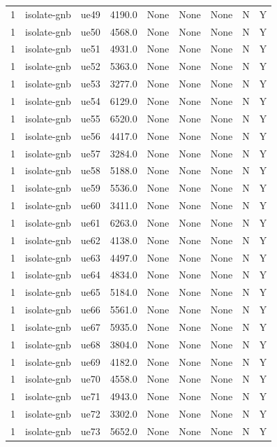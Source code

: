 \begin{table}[ht]
\begin{tabular}{|c|c|c|c|c|c|c|c|c|}
1 & isolate-gnb & ue49 & 4190.0 & None & None & None & N & Y \\
1 & isolate-gnb & ue50 & 4568.0 & None & None & None & N & Y \\
1 & isolate-gnb & ue51 & 4931.0 & None & None & None & N & Y \\
1 & isolate-gnb & ue52 & 5363.0 & None & None & None & N & Y \\
1 & isolate-gnb & ue53 & 3277.0 & None & None & None & N & Y \\
1 & isolate-gnb & ue54 & 6129.0 & None & None & None & N & Y \\
1 & isolate-gnb & ue55 & 6520.0 & None & None & None & N & Y \\
1 & isolate-gnb & ue56 & 4417.0 & None & None & None & N & Y \\
1 & isolate-gnb & ue57 & 3284.0 & None & None & None & N & Y \\
1 & isolate-gnb & ue58 & 5188.0 & None & None & None & N & Y \\
1 & isolate-gnb & ue59 & 5536.0 & None & None & None & N & Y \\
1 & isolate-gnb & ue60 & 3411.0 & None & None & None & N & Y \\
1 & isolate-gnb & ue61 & 6263.0 & None & None & None & N & Y \\
1 & isolate-gnb & ue62 & 4138.0 & None & None & None & N & Y \\
1 & isolate-gnb & ue63 & 4497.0 & None & None & None & N & Y \\
1 & isolate-gnb & ue64 & 4834.0 & None & None & None & N & Y \\
1 & isolate-gnb & ue65 & 5184.0 & None & None & None & N & Y \\
1 & isolate-gnb & ue66 & 5561.0 & None & None & None & N & Y \\
1 & isolate-gnb & ue67 & 5935.0 & None & None & None & N & Y \\
1 & isolate-gnb & ue68 & 3804.0 & None & None & None & N & Y \\
1 & isolate-gnb & ue69 & 4182.0 & None & None & None & N & Y \\
1 & isolate-gnb & ue70 & 4558.0 & None & None & None & N & Y \\
1 & isolate-gnb & ue71 & 4943.0 & None & None & None & N & Y \\
1 & isolate-gnb & ue72 & 3302.0 & None & None & None & N & Y \\
1 & isolate-gnb & ue73 & 5652.0 & None & None & None & N & Y \\

\end{tabular}
\end{table}
